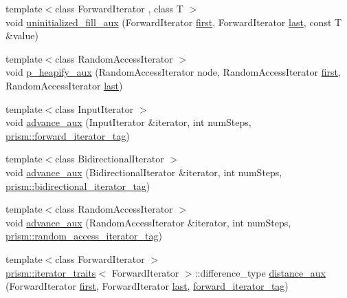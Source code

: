 \begin{DoxyCompactItemize}
{\footnotesize template$<$class Forward\+Iterator , class T $>$ }\\void \hyperlink{namespaceprism_aaa8fcd4a3943bfa624f77fc8f3af5916}{uninitialized\+\_\+fill\+\_\+aux} (Forward\+Iterator \hyperlink{namespaceprism_ae3fb7a1926a9e8e59300cd5e370470da}{first}, Forward\+Iterator \hyperlink{namespaceprism_abe4956c4e865f55ca126b7fb973b5078}{last}, const T \&value)
\item 
{\footnotesize template$<$class Random\+Access\+Iterator $>$ }\\void \hyperlink{namespaceprism_a95d95c728950cef3542d8b1dd27eb344}{p\+\_\+heapify\+\_\+aux} (Random\+Access\+Iterator node, Random\+Access\+Iterator \hyperlink{namespaceprism_ae3fb7a1926a9e8e59300cd5e370470da}{first}, Random\+Access\+Iterator \hyperlink{namespaceprism_abe4956c4e865f55ca126b7fb973b5078}{last})
\item 
{\footnotesize template$<$class Input\+Iterator $>$ }\\void \hyperlink{namespaceprism_add6ff58cf31e54607539740e32e030e6}{advance\+\_\+aux} (Input\+Iterator \&iterator, int num\+Steps, \hyperlink{structprism_1_1forward__iterator__tag}{prism\+::forward\+\_\+iterator\+\_\+tag})
\item 
{\footnotesize template$<$class Bidirectional\+Iterator $>$ }\\void \hyperlink{namespaceprism_a1bba402ba796a42eb306d91c41f99bf7}{advance\+\_\+aux} (Bidirectional\+Iterator \&iterator, int num\+Steps, \hyperlink{structprism_1_1bidirectional__iterator__tag}{prism\+::bidirectional\+\_\+iterator\+\_\+tag})
\item 
{\footnotesize template$<$class Random\+Access\+Iterator $>$ }\\void \hyperlink{namespaceprism_a3fe20025afc246261967bbfce7953d37}{advance\+\_\+aux} (Random\+Access\+Iterator \&iterator, int num\+Steps, \hyperlink{structprism_1_1random__access__iterator__tag}{prism\+::random\+\_\+access\+\_\+iterator\+\_\+tag})
\item 
{\footnotesize template$<$class Forward\+Iterator $>$ }\\\hyperlink{structprism_1_1iterator__traits}{prism\+::iterator\+\_\+traits}$<$ Forward\+Iterator $>$\+::difference\+\_\+type \hyperlink{namespaceprism_a533a2713a3809d8448bbfc2ebbddaa74}{distance\+\_\+aux} (Forward\+Iterator \hyperlink{namespaceprism_ae3fb7a1926a9e8e59300cd5e370470da}{first}, Forward\+Iterator \hyperlink{namespaceprism_abe4956c4e865f55ca126b7fb973b5078}{last}, \hyperlink{structprism_1_1forward__iterator__tag}{forward\+\_\+iterator\+\_\+tag})

\end{DoxyCompactItemize}

